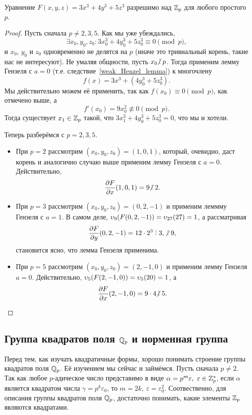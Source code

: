 	\begin{theorem} 
		Уравнение $F(x, y, z) = 3x^3 + 4y^3 + 5z^3$ разрешимо над $\mathbb{Z}_{p}$ для любого простого $p$.
	\end{theorem}
	\begin{proof}
		Пусть  сначала $p \neq 2, 3, 5$. Как мы уже убеждались, 
		\[
			\exists x_0, y_0, z_0 \colon 3x_0^3 + 4y_0^3 + 5z_0^3 \equiv 0 \pmod{p},
		\]
		и $x_0$, $y_0$ и $z_0$ одновременно не делятся на $p$ (иначе это тривиальный корень, такие нас не интересуют). Не умаляя общности, пусть $x_0 \notdivby p$. Тогда применим лемму Гензеля с $a = 0$ (т.е. следствие~\ref{weak_Henzel_lemma}) к многочлену 
		\[
			f(x) = 3x^3 + (4y_0^3 + 5z_0^3).
		\]
		Мы действительно можем её применить, так как $f(x_0) \equiv 0 \pmod{p}$, как отмечено выше, а 
		\[
			f'(x_0) = 9x_0^2 \not\equiv 0\pmod{p}.
		\]
		Тогда существует $x_1 \in \mathbb{Z}_{p}$ такой, что $3x_1^3 + 4y_0^3 + 5z_0^3 = 0$, что мы и хотели. 

		Теперь разберёмся с $p = 2, 3, 5$.

		\begin{itemize}
			\item При $p = 2$ рассмотрим $(x_0, y_0, z_0) = (1, 0, 1)$, который, очевидно, даст корень и аналогично случаю выше применим лемму Гензеля с $a = 0$. Действительно,
			\[
				\frac{\partial F}{\partial x}(1, 0, 1) = 9 \notdivby 2. 
			\]
			\item При $p = 3$ рассмотрим $(x_0, y_0, z_0) = (0, 2, -1)$ и применим леммму Гензеля с $a = 1$. В самом деле, $\upsilon_{9}(F(0, 2, -1)) = \upsilon_{27}(27) = 1$, а рассматривая 
			\[
				\frac{\partial F}{\partial y}(0, 2, -1) = 12 \cdot 2^3 \divby 3, \ \notdivby 9, 
			\]
			становится ясно, что лемма Гензеля применима. 
			\item При $p = 5$ рассмотрим $(x_0, y_0, z_0) = (2, -1, 0)$   и применим лемму Гензеля  $a = 0$. Действительно, $\upsilon_{5}(F(2, -1, 0)) = \upsilon_{5}(20) = 1$, а 
			\[
				\frac{\partial F}{\partial x}(2, - 1, 0) = 9 \cdot 4 \notdivby 5. 
			\]
			
		\end{itemize}
		
 	\end{proof}

 	\subsection{Группа квадратов поля $\mathbb{Q}_{p}$ и норменная группа}

	Перед тем, как изучать квадратичные формы, хорошо понимать строение группы квадратов поля $\mathbb{Q}_{p}$. Её изучением мы сейчас и займёмся. Пусть сначала $p \neq 2$. Так как любое $p$-адическое число представимо в виде $\alpha = p^m \varepsilon, \ \varepsilon \in \mathbb{Z}_{p}^{*}$,  если  $\alpha$ является квадратом  числа $\gamma = p^k \varepsilon_{0}$, то $m = 2k, \ \varepsilon = \varepsilon_0^2$. Соотвественно, для описания группы квадратов поля $\mathbb{Q}_{p}$, достаточно понимать, какие элементы $\mathbb{Z}_{p}$ являются квадратами. 

